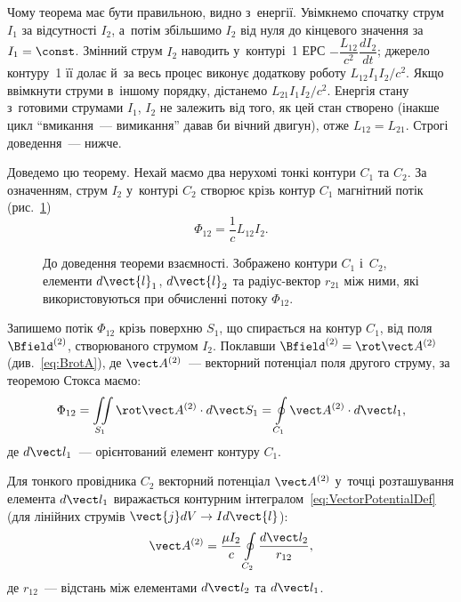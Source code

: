 Чому теорема має бути правильною, видно з~енергії. Увімкнемо спочатку струм $I_1$ за відсутності $I_2$, а~потім збільшимо $I_2$ від нуля до кінцевого значення за $I_1=\const$. Змінний струм $I_2$ наводить у~контурі~1 ЕРС $-\dfrac{L_{12}}{c^2}\dfrac{dI_2}{dt}$; джерело контуру~1 її долає й~за весь процес виконує додаткову роботу $L_{12}I_1I_2/c^2$. Якщо ввімкнути струми в~іншому порядку, дістанемо $L_{21}I_1I_2/c^2$. Енергія стану з~готовими струмами $I_1$, $I_2$ не залежить від того, як цей стан створено (інакше цикл \enquote{вмикання~--- вимикання} давав би вічний двигун), отже $L_{12}=L_{21}$. Строгі доведення~--- нижче.

Доведемо цю теорему. Нехай маємо два нерухомі тонкі контури $C_1$ та $C_2$. За означенням,
струм $I_2$ у~контурі $C_2$ створює крізь контур $C_1$ магнітний потік
(рис.~\ref{fig:mutual-inductance-reciprocity})
\begin{equation}\label{eq:MutualFlux12_def}
	\Phi_{12} = \frac{1}{c} L_{12} I_2.
\end{equation}

\begin{figure}\centering

	\caption{До доведення теореми взаємності. Зображено контури $C_1$ і~$C_2$, елементи
	$d\vect{l}_1$, $d\vect{l}_2$ та радіус-вектор $r_{21}$ між ними, які використовуються
	при обчисленні потоку $\Phi_{12}$.}
	\label{fig:mutual-inductance-reciprocity}
\end{figure}

Запишемо потік $\Phi_{12}$ крізь поверхню $S_1$, що спирається на контур $C_1$, від поля
$\Bfield^{(2)}$, створюваного струмом $I_2$. Поклавши $\Bfield^{(2)} = \rot\vect A^{(2)}$
(див.~\eqref{eq:BrotA}), де $\vect A^{(2)}$~--- векторний потенціал поля другого струму, за
теоремою Стокса маємо:
\begin{equation}\label{eq:FluxViaVectorPotential}
	\Phi_{12} = \iint\limits_{S_1}\rot\vect A^{(2)}\cdot d\vect S_1 = \oint\limits_{C_1}\vect A^{(2)}\cdot d\vect l_1,
\end{equation}
де $d\vect l_1$~--- орієнтований елемент контуру $C_1$.

Для тонкого провідника $C_2$ векторний потенціал $\vect A^{(2)}$ у~точці розташування
елемента $d\vect l_1$ виражається контурним інтегралом~\eqref{eq:VectorPotentialDef} (для
лінійних струмів $\vect{j} dV \to I d\vect{l}$):
\begin{equation}\label{eq:VectorPotentialLineCurrent}
	\vect A^{(2)} = \frac{\mu I_2}{c}\oint\limits_{C_2}\frac{d\vect l_2}{r_{12}},
\end{equation}
де $r_{12}$~--- відстань між елементами $d\vect l_2$ та $d\vect l_1$.

